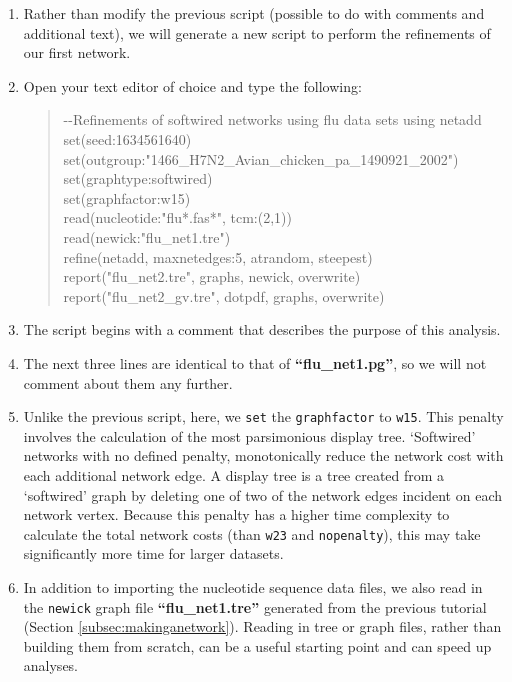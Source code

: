 \documentclass[11pt]{article}
\begin{document}
\begin {enumerate}

\item Rather than modify the previous script (possible to do with comments and 
additional text), we will generate a new script to perform the refinements of our
first network.

\item Open your text editor of choice and type the following:

	\begin{quote}	
	-\/-Refinements of softwired networks using flu data sets using netadd\\
	set(seed:1634561640)\\
	set(outgroup:"1466\_H7N2\_Avian\_chicken\_pa\_1490921\_2002")\\
	set(graphtype:softwired)\\
	set(graphfactor:w15)\\ 
	read(nucleotide:"flu*.fas*", tcm:(2,1))\\
	read(newick:"flu\_net1.tre")\\
	refine(netadd, maxnetedges:5, atrandom, steepest)\\
	report("flu\_net2.tre", graphs, newick, overwrite)\\
	report("flu\_net2\_gv.tre", dotpdf, graphs, overwrite)
	\end{quote}

\item The script begins with a comment that describes the purpose of this 
analysis.

\item The next three lines are identical to that of \textbf{``flu\_net1.pg''}, so we 
will not comment about them any further. 

\item Unlike the previous script, here, we \texttt{set} the \texttt{graphfactor} to 
\texttt{w15}. This penalty involves the calculation of the most parsimonious 
display tree. `Softwired' networks with no defined penalty, monotonically 
reduce the network cost with each additional network edge. A display tree is 
a tree created from a `softwired' graph by deleting one of two of the network 
edges incident on each network vertex. Because this penalty has a higher 
time complexity to calculate the total network costs (than \texttt{w23} and 
\texttt{nopenalty}), this may take significantly more time for larger datasets. 

\item In addition to importing the nucleotide sequence data files, we also
read in the \texttt{newick} graph file \textbf{``flu\_net1.tre''} generated from the 
previous tutorial (Section \ref{subsec:makinganetwork}). Reading in tree or graph 
files, rather than building them from scratch, can be a useful starting point and 
can speed up analyses.


\end{enumerate}
\end{document}
